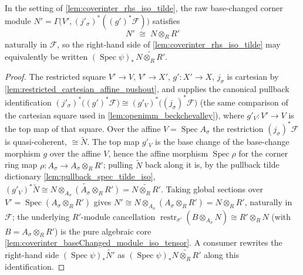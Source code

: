 \begin{lemma}
  \label{lem:coverinter_rhs_tensor_rewrite}
  In the setting of \cref{lem:coverinter_rhs_iso_tilde}, the raw base-changed corner module
  \(N' = \Gamma\bigl(V', (j'_\sigma)^*((g')^*\mathcal{F})\bigr)\) satisfies
  \[
    N' \;\cong\; N \otimes_R R'
  \]
  naturally in \(\mathcal{F}\), so the right-hand side of
  \cref{lem:coverinter_rhs_iso_tilde} may equivalently be written
  \((\operatorname{Spec}\psi)_*\,\widetilde{N \otimes_R R'}\).
\end{lemma}
\begin{proof}
  \leanok
  The restricted square
  \(V' \to V\), \(V' \to X'\), \(g' : X' \to X\), \(j_\sigma\) is cartesian by
  \cref{lem:restricted_cartesian_affine_pushout}, and supplies the canonical pullback
  identification \((j'_\sigma)^*\bigl((g')^*\mathcal{F}\bigr) \cong
  (g'_V)^*\bigl((j_\sigma)^*\mathcal{F}\bigr)\) (the same comparison of the cartesian square used
  in \cref{lem:openimm_beckchevalley}), where \(g'_V : V' \to V\) is the top map of that square.
  Over the affine \(V = \operatorname{Spec} A_\sigma\) the restriction \((j_\sigma)^*\mathcal{F}\)
  is quasi-coherent, \(\cong \widetilde{N}\). The top map \(g'_V\) is the base change of the
  base-change morphism \(g\) over the affine \(V\), hence the affine morphism
  \(\operatorname{Spec}\rho\) for the corner ring map \(\rho : A_\sigma \to A_\sigma \otimes_R R'\);
  pulling \(\widetilde{N}\) back along it is, by the pullback tilde dictionary
  \cref{lem:pullback_spec_tilde_iso},
  \((g'_V)^*\widetilde{N} \cong \widetilde{N \otimes_{A_\sigma}(A_\sigma \otimes_R R')}
  = \widetilde{N \otimes_R R'}\). Taking global sections over
  \(V' = \operatorname{Spec}(A_\sigma \otimes_R R')\) gives
  \(N' \cong N \otimes_{A_\sigma}(A_\sigma \otimes_R R') = N \otimes_R R'\), naturally in
  \(\mathcal{F}\); the underlying \(R'\)-module cancellation
  \(\operatorname{restr}_{\sigma'}(B \otimes_{A_\sigma} N) \cong R' \otimes_R N\) (with
  \(B = A_\sigma \otimes_R R'\)) is the pure algebraic core
  \cref{lem:coverinter_baseChanged_module_iso_tensor}. A consumer rewrites the right-hand side
  \((\operatorname{Spec}\psi)_*\widetilde{N'}\) as
  \((\operatorname{Spec}\psi)_*\widetilde{N \otimes_R R'}\) along this identification.
\end{proof}

